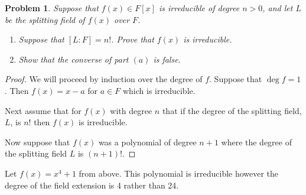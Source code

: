 \documentclass[10pt]{article}
\newcommand{\sk}{\vskip 10mm}
\theoremstyle{plain}
\newtheorem{problem}{Problem}
\theoremstyle{remark}
\begin{document}
\sk

\begin{problem}
  Suppose that $f(x) \in F[x]$ is irreducible of degree $n > 0$,
  and let $L$ be the splitting field of $f(x)$ over $F$.
\begin{enumerate}
    \item Suppose that $[L:F]=n!$. Prove that $f(x)$ is irreducible.
    \item Show that the converse of part $(a)$ is false.
\end{enumerate}
\end{problem}

\begin{proof}
  We will proceed by induction over the degree of $f$.
  Suppose that $\deg f=1$. Then $f(x)=x-a$ for $a\in F$
  which is irreducible.

  Next assume that for $f(x)$ with degree $n$ that if the degree
  of the splitting field, $L$, is $n!$ then $f(x)$ is irreducible.

  Now suppose that $f(x)$ was a polynomial of degree $n+1$ where
  the degree of the splitting field $L$ is $(n+1)!$.
\end{proof}

Let $f(x)=x^4+1$ from above. This polynomial is irreducible however
the degree of the field extension is 4 rather than 24.

\end{document}
